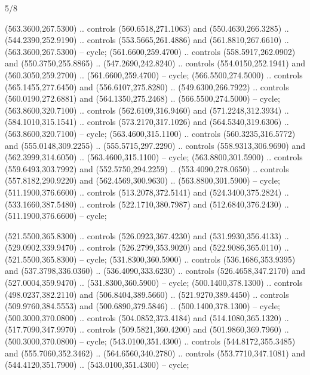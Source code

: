 \begin{flagdescription}{5/8}
\begin{scope}[shift={(0.5\flaglength,0.5\flagwidth)},scale=\flagwidth*\stretchfactor/820]
\begin{scope}[scale=1.84,xshift=-135mm,yshift=84mm]
\begin{scope}[y=0.80pt, x=0.80pt, yscale=-1, xscale=1]
\begin{scope}[cm={{1.01416,0.0,0.0,1.033,(-6.79641,-9.89449)}}]
\begin{scope}[draw=c24420e]
\begin{scope}[line width=0.131\lw]
\begin{scope}[fill=c67923d]
 (563.3600,267.5300) .. controls (560.6518,271.1063) and
  (550.4630,266.3285) .. (544.2390,252.9190) .. controls (553.5665,261.4886) and
  (561.8810,267.6610) .. (563.3600,267.5300) -- cycle;
 (561.6600,259.4700) .. controls (558.5917,262.0902) and
  (550.3750,255.8865) .. (547.2690,242.8240) .. controls (554.0150,252.1941) and
  (560.3050,259.2700) .. (561.6600,259.4700) -- cycle;
 (566.5500,274.5000) .. controls (565.1455,277.6450) and
  (556.6107,275.8280) .. (549.6300,266.7922) .. controls (560.0190,272.6881) and
  (564.1350,275.2468) .. (566.5500,274.5000) -- cycle;
 (563.8600,320.7100) .. controls (562.6109,316.9460) and
  (571.2248,312.3934) .. (584.1010,315.1541) .. controls (573.2170,317.1026) and
  (564.5340,319.6306) .. (563.8600,320.7100) -- cycle;
 (563.4600,315.1100) .. controls (560.3235,316.5772) and
  (555.0148,309.2255) .. (555.5715,297.2290) .. controls (558.9313,306.9690) and
  (562.3999,314.6050) .. (563.4600,315.1100) -- cycle;
 (563.8800,301.5900) .. controls (559.6493,303.7992) and
  (552.5750,294.2259) .. (553.4090,278.0650) .. controls (557.8182,290.9220) and
  (562.4569,300.9630) .. (563.8800,301.5900) -- cycle;
 (511.1900,376.6600) .. controls (513.2078,372.5141) and
  (524.3400,375.2824) .. (533.1660,387.5480) .. controls (522.1710,380.7987) and
  (512.6840,376.2430) .. (511.1900,376.6600) -- cycle;
\end{scope}
\begin{scope}[fill=c406325]
 (521.5500,365.8300) .. controls (526.0923,367.4230) and
  (531.9930,356.4133) .. (529.0902,339.9470) .. controls (526.2799,353.9020) and
  (522.9086,365.0110) .. (521.5500,365.8300) -- cycle;
 (531.8300,360.5900) .. controls (536.1686,353.9395) and
  (537.3798,336.0360) .. (536.4090,333.6230) .. controls (526.4658,347.2170) and
  (527.0004,359.9470) .. (531.8300,360.5900) -- cycle;
 (500.1400,378.1300) .. controls (498.0237,382.2110) and
  (506.8404,389.5660) .. (521.9270,389.4450) .. controls (509.9760,384.5553) and
  (500.6890,379.5846) .. (500.1400,378.1300) -- cycle;
 (500.3000,370.0800) .. controls (504.0852,373.4184) and
  (514.1080,365.1320) .. (517.7090,347.9970) .. controls (509.5821,360.4200) and
  (501.9860,369.7960) .. (500.3000,370.0800) -- cycle;
 (543.0100,351.4300) .. controls (544.8172,355.3485) and
  (555.7060,352.3462) .. (564.6560,340.2780) .. controls (553.7710,347.1081) and
  (544.4120,351.7900) .. (543.0100,351.4300) -- cycle;

\end{scope}
\end{scope}
\end{scope}
\end{scope}
\end{scope}
\end{scope}
\end{scope}
\end{flagdescription}
